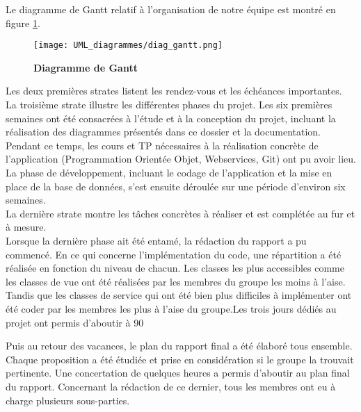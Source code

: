 \documentclass[11pt]{article}
\begin{document}
\bigbreak

Le diagramme de Gantt relatif à l'organisation de notre équipe est montré en figure \ref{UML_gantt}.\\


\begin{figure}[H]
    \caption{\textbf{Diagramme de Gantt}}
    \label{UML_gantt}
    \centering
    \texttt{[image: UML\_diagrammes/diag\_gantt.png]}
\end{figure}

Les deux premières strates listent les rendez-vous et les échéances importantes. \\

La troisième strate illustre les différentes phases du projet. Les six premières semaines ont été consacrées à l'étude et à la conception du projet, incluant la réalisation des diagrammes présentés dans ce dossier et la documentation. Pendant ce temps, les cours et TP nécessaires à la réalisation concrète de l'application (Programmation Orientée Objet, Webservices, Git) ont pu avoir lieu. La phase de développement, incluant le codage de l'application et la mise en place de la base de données, s'est ensuite déroulée sur une période d'environ six semaines. \\

La dernière strate montre les tâches concrètes à réaliser et est complétée au fur et à mesure.\\

Lorsque la dernière phase ait été entamé, la rédaction du rapport a pu commencé. 
En ce qui concerne l’implémentation du code, une répartition a été réalisée en fonction du niveau de chacun. Les classes les plus accessibles comme les classes de vue ont été réalisées par les membres du groupe les moins à l’aise. Tandis que les classes de service qui ont été bien plus difficiles à implémenter ont été coder par les membres les plus à l’aise du groupe.Les trois jours dédiés au projet ont permis d’aboutir à 90%

Puis au retour des vacances, le plan du rapport final a été élaboré tous ensemble. Chaque proposition a été étudiée et prise en considération si le groupe la trouvait pertinente. Une concertation de quelques heures a permis d’aboutir au plan final du rapport. Concernant la rédaction de ce dernier, tous les membres ont eu à charge plusieurs sous-parties.


\end{document}

